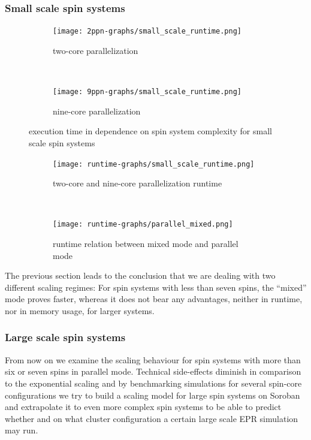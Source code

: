\documentclass[11.5pt,a4paper]{article}
\begin{document}
\subsubsection{Small scale spin systems}
\begin{figure}
        \begin{subfigure}[b]{0.45\textwidth}
                \centering
                \texttt{[image: 2ppn-graphs/small\_scale\_runtime.png]}
                \caption{two-core parallelization}
                \label{fig-2ppn-sc-runtime}
        \end{subfigure}
        ~ 
        \begin{subfigure}[b]{0.45\textwidth}
                \centering
                \texttt{[image: 9ppn-graphs/small\_scale\_runtime.png]}
                \caption{nine-core parallelization}
                \label{fig-9ppn-sc-memory}
        \end{subfigure}
	\caption{execution time in dependence on spin system complexity for small scale spin systems}
	\label{fig-sc-runtime}
\end{figure}

\begin{figure}
        \begin{subfigure}[b]{0.45\textwidth}
                \centering
                \texttt{[image: runtime-graphs/small\_scale\_runtime.png]}
                \caption{two-core and nine-core parallelization runtime}
                \label{fig-total-sc-runtime}
        \end{subfigure}
        ~ 
        \begin{subfigure}[b]{0.45\textwidth}
                \centering
                \texttt{[image: runtime-graphs/parallel\_mixed.png]}
                \caption{runtime relation between mixed mode and parallel mode}
                \label{fig-parallel-mixed-runtime}
        \end{subfigure}
	\caption{}
	\label{fig-sc-runtime-2}
\end{figure}
The previous section leads to the conclusion that we are dealing with two different scaling regimes: For spin systems with less than seven spins, the ``mixed'' mode proves faster, whereas it does not bear any advantages, neither in runtime, nor in memory usage, for larger systems.

\subsubsection{Large scale spin systems}
From now on we examine the scaling behaviour for spin systems with more than six or seven spins in parallel mode. Technical side-effects diminish in comparison to the exponential scaling and by benchmarking simulations for several spin-core configurations we try to build a scaling model for large spin systems on Soroban and extrapolate it to even more complex spin systems to be able to predict whether and on what cluster configuration a certain large scale EPR simulation may run. 
\end{document}
